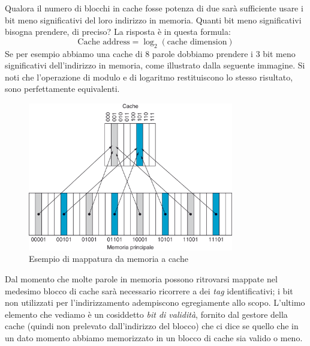 \documentclass[class=book, crop=false, oneside]{standalone}
\begin{document}
Qualora il numero di blocchi in cache fosse potenza di due sarà sufficiente usare i bit meno significativi del loro indirizzo in memoria. Quanti bit meno significativi bisogna prendere, di preciso? La risposta è in questa formula:
\begin{equation*}
	\textrm{Cache address}=\log_2 (\textrm{cache dimension})
\end{equation*}
Se per esempio abbiamo una cache di 8 parole dobbiamo prendere i 3 bit meno significativi dell'indirizzo in memoria, come illustrato dalla seguente immagine.
Si noti che l'operazione di modulo e di logaritmo restituiscono lo stesso risultato, sono perfettamente equivalenti.
\begin{figure}[H]
	\centering
	\includegraphics[width=0.8\textwidth,keepaspectratio]{logad.png}
	\caption{Esempio di mappatura da memoria a cache}
\end{figure}
Dal momento che molte parole in memoria possono ritrovarsi mappate nel medesimo blocco di cache sarà necessario ricorrere a dei \emph{tag} identificativi; i bit non utilizzati per l'indirizzamento adempiscono egregiamente allo scopo. L'ultimo elemento che vediamo è un cosiddetto \emph{bit di validità}, fornito dal gestore della cache (quindi non prelevato dall'indirizzo del blocco) che ci dice se quello che in un dato momento abbiamo memorizzato in un blocco di cache sia valido o meno.
\end{document}
